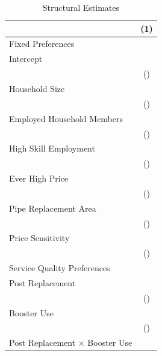 \documentclass[12pt,table]{article}
\begin{document}
\begin{table}[h!] 
\centering
\caption{Structural Estimates}\label{table:estimates}
\vspace{-2mm}
\begin{threeparttable}
\begin{tabular}{@{}l*{1}{c}@{}}
\toprule
  &  (1)   \\
\midrule
Fixed Preferences & \\
\hspace{1em}Intercept &  \\
 						& () \\
\hspace{1em}Household Size &  \\
 							& () \\
\hspace{1em}Employed Household Members &  \\
 						& () \\
\hspace{1em}High Skill Employment &  \\
 						& () \\
\hspace{1em}Ever High Price &  \\
 						& () \\
\hspace{1em}Pipe Replacement Area &  \\
 						& () \\[.5em]
Price Sensitivity &  \\
 						& () \\[.5em]
Service Quality Preferences & \\
\hspace{1em}Post Replacement &  \\
 						& () \\
\hspace{1em}Booster Use &  \\
 							& () \\
\hspace{1em}Post Replacement $\times$ Booster Use &  \\

\end{tabular}
\end{threeparttable}
\end{table}
\end{document}
